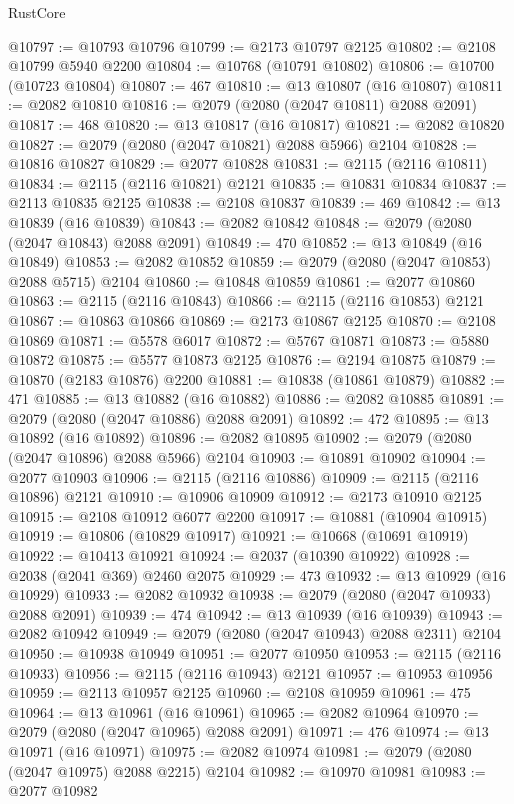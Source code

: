 \begin{lexlean}{RustCore}
\begin{coremodule}
@10797 := @10793 @10796
@10799 := @2173 @10797 @2125
@10802 := @2108 @10799 @5940 @2200
@10804 := @10768 (@10791 @10802)
@10806 := @10700 (@10723 @10804)
@10807 := 467
@10810 := @13 @10807 (@16 @10807)
@10811 := @2082 @10810
@10816 := @2079 (@2080 (@2047 @10811) @2088 @2091)
@10817 := 468
@10820 := @13 @10817 (@16 @10817)
@10821 := @2082 @10820
@10827 := @2079 (@2080 (@2047 @10821) @2088 @5966) @2104
@10828 := @10816 @10827
@10829 := @2077 @10828
@10831 := @2115 (@2116 @10811)
@10834 := @2115 (@2116 @10821) @2121
@10835 := @10831 @10834
@10837 := @2113 @10835 @2125
@10838 := @2108 @10837
@10839 := 469
@10842 := @13 @10839 (@16 @10839)
@10843 := @2082 @10842
@10848 := @2079 (@2080 (@2047 @10843) @2088 @2091)
@10849 := 470
@10852 := @13 @10849 (@16 @10849)
@10853 := @2082 @10852
@10859 := @2079 (@2080 (@2047 @10853) @2088 @5715) @2104
@10860 := @10848 @10859
@10861 := @2077 @10860
@10863 := @2115 (@2116 @10843)
@10866 := @2115 (@2116 @10853) @2121
@10867 := @10863 @10866
@10869 := @2173 @10867 @2125
@10870 := @2108 @10869
@10871 := @5578 @6017
@10872 := @5767 @10871
@10873 := @5880 @10872
@10875 := @5577 @10873 @2125
@10876 := @2194 @10875
@10879 := @10870 (@2183 @10876) @2200
@10881 := @10838 (@10861 @10879)
@10882 := 471
@10885 := @13 @10882 (@16 @10882)
@10886 := @2082 @10885
@10891 := @2079 (@2080 (@2047 @10886) @2088 @2091)
@10892 := 472
@10895 := @13 @10892 (@16 @10892)
@10896 := @2082 @10895
@10902 := @2079 (@2080 (@2047 @10896) @2088 @5966) @2104
@10903 := @10891 @10902
@10904 := @2077 @10903
@10906 := @2115 (@2116 @10886)
@10909 := @2115 (@2116 @10896) @2121
@10910 := @10906 @10909
@10912 := @2173 @10910 @2125
@10915 := @2108 @10912 @6077 @2200
@10917 := @10881 (@10904 @10915)
@10919 := @10806 (@10829 @10917)
@10921 := @10668 (@10691 @10919)
@10922 := @10413 @10921
@10924 := @2037 (@10390 @10922)
@10928 := @2038 (@2041 @369) @2460 @2075
@10929 := 473
@10932 := @13 @10929 (@16 @10929)
@10933 := @2082 @10932
@10938 := @2079 (@2080 (@2047 @10933) @2088 @2091)
@10939 := 474
@10942 := @13 @10939 (@16 @10939)
@10943 := @2082 @10942
@10949 := @2079 (@2080 (@2047 @10943) @2088 @2311) @2104
@10950 := @10938 @10949
@10951 := @2077 @10950
@10953 := @2115 (@2116 @10933)
@10956 := @2115 (@2116 @10943) @2121
@10957 := @10953 @10956
@10959 := @2113 @10957 @2125
@10960 := @2108 @10959
@10961 := 475
@10964 := @13 @10961 (@16 @10961)
@10965 := @2082 @10964
@10970 := @2079 (@2080 (@2047 @10965) @2088 @2091)
@10971 := 476
@10974 := @13 @10971 (@16 @10971)
@10975 := @2082 @10974
@10981 := @2079 (@2080 (@2047 @10975) @2088 @2215) @2104
@10982 := @10970 @10981
@10983 := @2077 @10982

\end{coremodule}
\end{lexlean}
